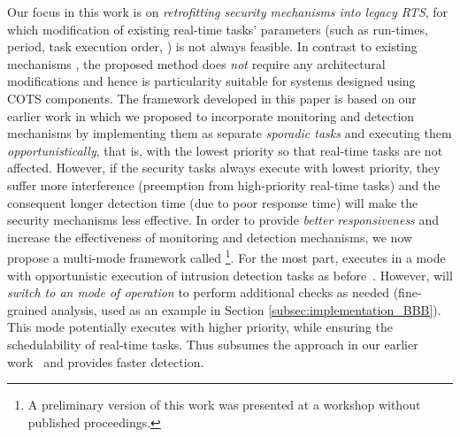 \documentclass[../rt_server_main.tex]{subfiles}
\begin{document}
Our focus in this work is on \textit{retrofitting security mechanisms into legacy RTS}, for which modification of existing real-time tasks' parameters (such as run-times, period, task execution order, \etc) is not always feasible. In contrast to existing mechanisms \cite{slack_cornell, securecore}, the proposed method does \textit{not} require any architectural modifications and hence is particularity suitable for systems designed using COTS components. The framework developed in this paper is based on our earlier work \cite{mhasan_rtss16} %
in which we proposed to incorporate monitoring and detection mechanisms by implementing them as separate \textit{sporadic tasks} and executing them \textit{opportunistically}, that is, with the lowest priority so that real-time tasks are not affected.
However, if the security tasks always execute with lowest priority, they suffer more interference (\ie preemption from high-priority real-time tasks) and the consequent longer detection time (due to poor response time) will make the security mechanisms less effective. In order to provide \textit{better responsiveness} and increase the effectiveness of monitoring and detection mechanisms,  
we now propose a multi-mode framework called \coolname\footnote{A preliminary version \cite{mhasan_certs16} of this work was presented at a workshop without published proceedings.}. For the most part, \coolname executes in a \pve mode with opportunistic execution of intrusion detection tasks as before~\cite{mhasan_rtss16}. However, \coolname will \textit{switch to an \ave mode of operation} to perform additional checks as needed (\eg fine-grained analysis, used as an example in Section \ref{subsec:implementation_BBB}). This \ave mode potentially executes with higher priority, while ensuring the schedulability of real-time tasks. Thus \coolname subsumes the approach in our earlier work~\cite{mhasan_rtss16} and provides faster detection.  
\end{document}
